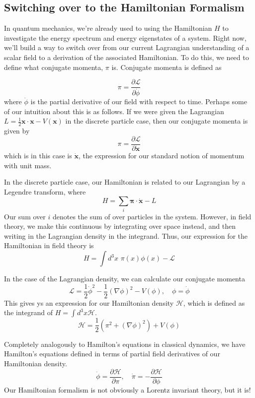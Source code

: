 \subsection{Switching over to the Hamiltonian Formalism} 
In quantum mechanics, we're already used to using the Hamiltonian $H$ to investigate the energy spectrum and energy eigenstates of a system. Right now, we'll build a way to switch over from our current Lagrangian understanding of a scalar field to a derivation of the associated Hamiltonian. To do this, we need to define what conjugate momenta, $ \pi $ is. Conjugate momenta is defined as 

\[ \pi  = \frac{ \partial \mathcal{L} } { \partial \dot{ \phi} } \] 
where $\dot{ \phi } $ is the partial derivative of our field with respect to time. Perhaps some of our intuition about this is as follows. If we were given the Lagrangian $L = \frac{ 1}{ 2} \mathbf{ x} \cdot \mathbf{ x}  - V ( \mathbf{ x} ) $ in the discrete particle case, then our conjugate momenta is given by \[ \pi = \frac{ \partial \mathcal{ L } }{ \partial \dot{\mathbf{x}}} \] which is in this case is $ \dot{\mathbf{x}} $, the expression for our standard notion of momentum with unit mass. 

In the discrete particle case, our Hamiltonian is related to our Lagrangian by a Legendre transform, where \[ 
H = \sum_i \mathbf{\pi} \cdot  \dot{ \mathbf{ x}} - L \] Our sum over $i$ 
denotes the sum of over particles in the system. However, in field theory, we make this continuous by integrating over space instead, and then writing in the Lagrangian density in the integrand. Thus, our expression for the Hamiltonian in field theory is \[ H = \int d^3 x \, \, \pi( x) \phi(x)  - \mathcal{ L } \] 

In the case of the Lagrangian density, we can calculate our conjugate momenta 
\[ 
\mathcal{L}  = \frac{ 1} {2} \dot{\phi}^2  - \frac{1}{ 2} (\nabla \phi)^2  - V( \phi ), \quad \phi  = \dot{\phi} 
\] 
This gives ys an expression for our Hamiltonian density $\mathcal{H}$, which is defined as the integrand of $H = \int d^3 x \mathcal{H} $. 
\[ 
\mathcal{H} = \frac{1}{ 2} ( \pi^ 2 + ( \nabla \phi)^ 2 ) + V(\phi ) 
\] 

Completely analogously to Hamilton's equations in classical dynamics, we have Hamilton's equations defined in terms of partial field derivatives of our Hamiltonian density. 
\[ 
\dot{\phi} = \frac{ \partial  \mathcal{H}}{ \partial \pi }, \quad \dot{\pi} =  - \frac{ \partial \mathcal{H}}{ \partial \phi} 
\] Our Hamiltonian formalism is not obviously a Lorentz invariant theory, but it is!

